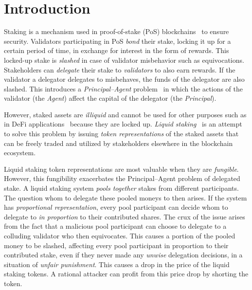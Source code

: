 \section{Introduction}

Staking is a mechanism used in proof-of-stake (PoS)
blockchains~\cite{2018tendermint,buchman2016tendermint,ouroboros,algorand,casper}
to ensure security. Validators participating in PoS
\emph{bond} their stake, locking it up for a certain period of time,
in exchange for interest in the form of rewards.
This locked-up stake is \emph{slashed} in case of validator misbehavior
such as equivocations.
Stakeholders can \emph{delegate} their stake to \emph{validators} to also
earn rewards. If the validator a delegator delegates to misbehaves,
the funds of the delegator are also slashed. This introduces a
\emph{Principal--Agent} problem~\cite{jensen1976,wealthofnations}
in which the actions of the validator (the \emph{Agent})
affect the capital of the delegator (the \emph{Principal}).

However, staked assets are \emph{illiquid} and cannot be used for
other purposes such as in DeFi applications~\cite{defi-sok}
because they are locked up.
\emph{Liquid staking}~\cite{liquid-staking-report}
is an attempt to solve this problem by issuing
\emph{token representations} of the staked assets that can be freely traded
and utilized by stakeholders elsewhere in the blockchain ecosystem.

Liquid staking token representations are most valuable when they are
\emph{fungible}. However, this fungibility exacerbates the Principal--Agent
problem of delegated stake.
A liquid staking system \emph{pools together} stakes from different participants.
The question whom to delegate these pooled moneys to then arises.
If the system has \emph{proportional representation}, every pool participant
can decide whom to delegate to \emph{in proportion} to their contributed shares.
The crux of the issue arises from the fact
that a malicious pool participant can choose to delegate to
a colluding validator who then equivocates. This causes a portion
of the pooled money to be slashed, affecting every pool participant
in proportion to their contributed stake, even if they never made
any \emph{unwise} delegation decisions, in a situation of
\emph{unfair punishment}. This causes a drop in the price of the
liquid staking tokens. A rational attacker can profit from this price
drop by shorting the token.

